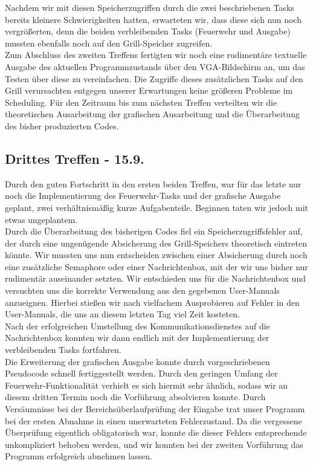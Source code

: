 Nachdem wir mit diesen Speicherzugriffen durch die zwei beschriebenen Tasks bereits kleinere Schwierigkeiten hatten, erwarteten wir, dass diese sich nun noch vergrößerten, denn die beiden verbleibenden Tasks (Feuerwehr und Ausgabe) mussten ebenfalls noch auf den Grill-Speicher zugreifen.\\
Zum Abschluss des zweiten Treffens fertigten wir noch eine rudimentäre textuelle Ausgabe des aktuellen Programmzustands über den VGA-Bildschirm an, um das Testen über diese zu vereinfachen. Die Zugriffe dieses zusätzlichen Tasks auf den Grill verursachten entgegen unserer Erwartungen keine größeren Probleme im Scheduling. Für den Zeitraum bis zum nächsten Treffen verteilten wir die theoretischen Ausarbeitung der grafischen Ausarbeitung und die Überarbeitung des bisher produzierten Codes.

\subsection{Drittes Treffen - 15.9.}

Durch den guten Fortschritt in den ersten beiden Treffen, war für das letzte nur noch die Implementierung des Feuerwehr-Tasks und der grafische Ausgabe geplant, zwei verhältnismäßig kurze Aufgabenteile. Beginnen taten wir jedoch mit etwas ungeplantem.\\
Durch die Überarbeitung des bisherigen Codes fiel ein Speicherzugriffsfehler auf, der durch eine ungenügende Absicherung des Grill-Speichers theoretisch eintreten könnte. Wir mussten uns nun entscheiden zwischen einer Absicherung durch noch eine zusätzliche Semaphore oder einer Nachrichtenbox, mit der wir uns bisher nur rudimentär auseinander setzten. Wir entschieden uns für die Nachrichtenbox und versuchten uns die korrekte Verwendung aus den gegebenen User-Manuals anzueignen. Hierbei stießen wir nach vielfachem Ausprobieren auf Fehler in den User-Manuals, die uns an diesem letzten Tag viel Zeit kosteten.\\

Nach der erfolgreichen Umstellung des Kommunikationsdienstes auf die Nachrichtenbox konnten wir dann endlich mit der Implementierung der verbleibenden Tasks fortfahren.\\
Die Erweiterung der grafischen Ausgabe konnte durch vorgeschriebenen Pseudocode schnell fertiggestellt werden. Durch den geringen Umfang der Feuerwehr-Funktionalität verhielt es sich hiermit sehr ähnlich, sodass wir an diesem dritten Termin noch die Vorführung absolvieren konnte. Durch Versäumnisse bei der Bereichsüberlaufprüfung der Eingabe trat unser Programm bei der ersten Abnahme in einen unerwarteten Fehlerzustand. Da die vergessene Überprüfung eigentlich obligatorisch war, konnte die dieser Fehlers entsprechende unkompliziert behoben werden, und wir konnten bei der zweiten Vorführung das Programm erfolgreich abnehmen lassen.\\

